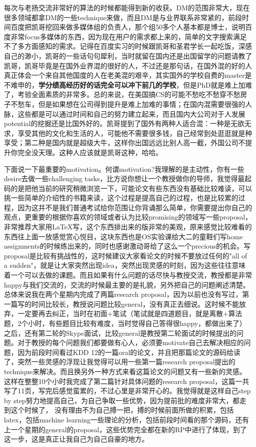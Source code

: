 每次与老扬交流非常好的算法的时候都能得到新的收获。DM的范围非常大，现在很多领域都拿DM的一些technique来做，而且DM是与业界联系非常紧的，前段时间百度把凯哥挖回来做多媒体组的负责人，那个组50多个人基本都是博士，说明百度非常focus多媒体的东西，因为现在用户的需求都上来的，简单的文字搜索满足不了多方面感知的需求。记得在百度实习的时候跟凯哥和圣君学长一起吃饭，深感自己的渺小，凯哥的一些话句句犀利，当时就留在国内还是出国留学的问题请教了凯哥，凯哥毕竟是在国外业界混的很好的人，不过还是那句话，在国外混的好的人真正体会一个来自其他国度的人在老美混的艰辛，其实国外的学校自费的master是不难申的，\textbf{学分绩高经历好的话完全可以冲下前几的学校}，但是PhD就是难上加难了，考验全面素质的非常多。总的来说，在美国搞CS的可能不愁吃不愁穿不愁房子不愁车，但是如果想在公司得到提升是难上加难的事情；在国内混需要很强的人脉，这些都是可以通过时间和自己的努力建立起来，而且国内大公司对于人发展potential的挖掘还是比国外好的。凯哥提到了国外有两种人适合混：一种是无欲无求，享受其他的文化和生活的人，可能他不需要很多钱，自己经常到处逛逛就是种享受；第二种是国内就是超级大牛，这样你出国远远比别人高一截，外国公司不提升你完全没天理。这种人应该就是凯哥这种，哈哈。\par
 


下面说一下最重要的motivation。何谓motivation?我理解的是主动性，你有一些desire去做一些challenging tasks，比方说你想让一个教授做你的导师，我觉得最起码的是把他当前的研究稍微浏览一下，可能论文有些东西没有基础比较难读，可以挑一些简单的介绍性的书籍来读，这个过程是提高自己的过程，也是比较累的过程，因为这并不是我们普通考试给你范围让你背诵那么简单，你需要提出你自己的观点，更重要的根据你喜欢的领域或者认为比较promising的领域写一些proposal，非常推荐大家用\LaTeX{}写，这个东西排出来的版非常的美观，原来感觉比较难看的东西往上面一放感觉赏心悦目，这块东西也是OS实验课给大二的童鞋们写home assignments的时候练出来的，同时也感谢激动哥给了这么一个precious的机会。写proposal是比较有挑战性的，这时候建议大家看论文的时候不要放过任何的"all of a sudden"，就是让大家突然出现idea，突然出现灵感的时刻，因为这些往往意味着一个可以去做的课题。而且如果有什么问题的话尽快与教授交流，教授都是非常happy与我们交流的，交流的时候最主要的是礼貌，另外把自己的问题阐述清楚。总体来说我在两个星期内完成了两篇research proposal，因为以前也没有写过，第一篇写的时间比较长，教授说问题比较general，没有真正去细说。这时候不能放弃，一定要再去纠正，当时在初面+笔试（笔试就是四道题目，就是离散+算法题，2个小时，有些题目比较有难度，当时觉得自己答得很happy，都做出来了）之后，还有第二轮的Skype面试，比较general是教授第二轮面试的时候提出的问题。对于教授的每个问题我们都要做有心人，必须要motivate自己去解决相应的问题，因为前段时间看过KDD 12的一篇oral的论文，并且把那篇论文的源码给读了，突然一些灵感的浮现让我觉得可以用一些第一篇research proposal提出的technique来解决。而且换另外一种方式来看这篇论文的问题又有一些新的灵感。这样在整整10个小时我完成了第二篇针对具体问题的research proposal，这篇一共写了11页，写完后感觉蛮累的，不过心里是非常开心的。我觉得就是这样自己step by step努力地提高自己，为自己争取一些优势，因为提前批的难度非常大，都走到这个时候了， 没有理由不为自己搏一把，搏的时候前面所做的积累，包括latex，包括machine learning一些理论的分析，包括前段时间看的那个源码，还有上一个星期的general的proposal，这些优势完全都在新的RP中进行了体现，到了这一步，这是真正让我自己为自己自豪的地方。\par
 
